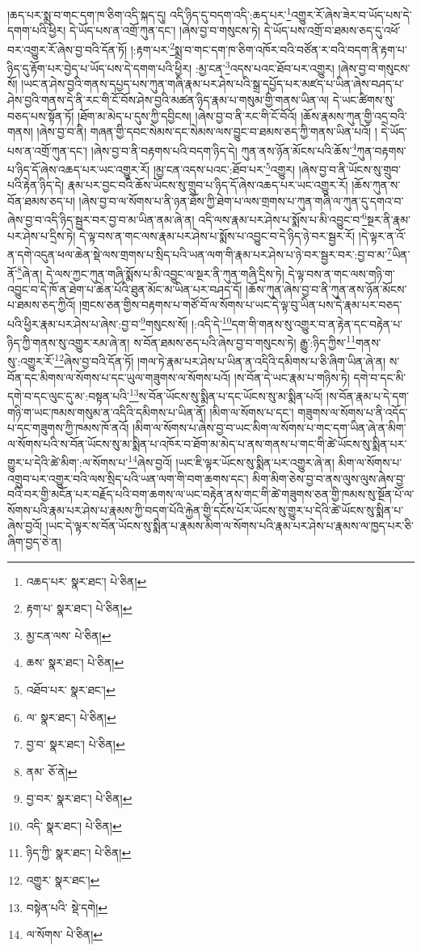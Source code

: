།ཆད་པར་སྨྲ་བ་གང་དག་ཁ་ཅིག་འདི་སྐད་དུ། འདི་ཉིད་དུ་བདག་འདི་:ཆད་པར་\footnote{འཆད་པར་  སྣར་ཐང་།  པེ་ཅིན། }འགྱུར་རོ་ཞེས་ཟེར་བ་ཡོད་པས་དེ་དགག་པའི་ཕྱིར། དེ་ཡོད་པས་ན་འགྲོ་ཀུན་དང་། །ཞེས་བྱ་བ་གསུངས་ཏེ། དེ་ཡོད་པས་འགྲོ་བ་ཐམས་ཅད་དུ་འཕོ་བར་འགྱུར་རོ་ཞེས་བྱ་བའི་དོན་ཏོ། །:རྟག་པར་\footnote{རྟག་པ་  སྣར་ཐང་།  པེ་ཅིན། }སྨྲ་བ་གང་དག་ཁ་ཅིག་འཁོར་བའི་བཙོན་ར་བའི་བདག་ནི་རྟག་པ་ཉིད་དུ་རྟོག་པར་བྱེད་པ་ཡོད་པས་དེ་དགག་པའི་ཕྱིར། :མྱ་ངན་\footnote{མྱ་ངན་ལས་  པེ་ཅིན། }འདས་པའང་ཐོབ་པར་འགྱུར། །ཞེས་བྱ་བ་གསུངས་སོ། །ཡང་ན་ཤེས་བྱའི་གནས་དཔྱད་པས་ཀུན་གཞི་རྣམ་པར་ཤེས་པའི་སྒྲ་དཔྱོད་པར་མཛད་པ་ཡིན་ཞེས་བཤད་པ་ཤེས་བྱའི་གནས་དེ་ནི་རང་གི་ངོ་བོས་ཤེས་བྱའི་མཚན་ཉིད་རྣམ་པ་གསུམ་གྱི་གནས་ཡིན་ལ། དེ་ཡང་ཚིགས་སུ་བཅད་པས་སྟོན་ཏོ། །ཐོག་མ་མེད་པ་དུས་ཀྱི་དབྱིངས། །ཞེས་བྱ་བ་ནི་རང་གི་ངོ་བོའོ། །ཆོས་རྣམས་ཀུན་གྱི་འདྲ་བའི་གནས། །ཞེས་བྱ་བ་ནི། གཞན་གྱི་དབང་སེམས་དང་སེམས་ལས་བྱུང་བ་ཐམས་ཅད་ཀྱི་གནས་ཡིན་པའོ། །
དེ་ཡོད་པས་ན་འགྲོ་ཀུན་དང་། །ཞེས་བྱ་བ་ནི་བརྟགས་པའི་བདག་ཉིད་དེ། ཀུན་ནས་ཉོན་མོངས་པའི་ཆོས་\footnote{ཆས་  སྣར་ཐང་།  པེ་ཅིན། }ཀུན་བརྟགས་པ་ཉིད་དོ་ཞེས་འཆད་པར་ཡང་འགྱུར་རོ། །མྱ་ངན་འདས་པའང་:ཐོབ་པར་\footnote{འཐོབ་པར་  སྣར་ཐང་། }འགྱུར། །ཞེས་བྱ་བ་ནི་ཡོངས་སུ་གྲུབ་པའི་རྟེན་ཉིད་དེ། རྣམ་པར་བྱང་བའི་ཆོས་ཡོངས་སུ་གྲུབ་པ་ཉིད་དོ་ཞེས་འཆད་པར་ཡང་འགྱུར་རོ། །ཆོས་ཀུན་ས་བོན་ཐམས་ཅད་པ། །ཞེས་བྱ་བ་ལ་སོགས་པ་ནི་ཉན་ཐོས་ཀྱི་ཐེག་པ་ལས་གྲགས་པ་ཀུན་གཞི་ལ་ཀུན་དུ་དགའ་བ་ཞེས་བྱ་བ་འདི་ཉིད་སྦྱར་བར་བྱ་བ་མ་ཡིན་ནམ་ཞེ་ན། འདི་ལས་རྣམ་པར་ཤེས་པ་སྨོས་པ་མི་འབྱུང་བ་\footnote{ལ་  སྣར་ཐང་།  པེ་ཅིན། }སྔར་ནི་རྣམ་པར་ཤེས་པ་དྲིས་ཏེ། དེ་ལྟ་བས་ན་གང་ལས་རྣམ་པར་ཤེས་པ་སྨོས་པ་འབྱུང་བ་དེ་ཉིད་ཉེ་བར་སྦྱར་རོ། །དེ་ལྟར་ན་འོ་ན་དགེ་འདུན་ཕལ་ཆེན་སྡེ་ལས་གྲགས་པ་སྲིད་པའི་ཡན་ལག་གི་རྣམ་པར་ཤེས་པ་ཉེ་བར་སྦྱར་བར་:བྱ་བ་མ་\footnote{བྱ་བ་  སྣར་ཐང་།  པེ་ཅིན། }ཡིན་ནོ་\footnote{ནམ་  ཅོ་ནེ། }ཞེ་ན། དེ་ལས་ཀྱང་ཀུན་གཞི་སྨོས་པ་མི་འབྱུང་ལ་སྔར་ནི་ཀུན་གཞི་དྲིས་ཏེ། དེ་ལྟ་བས་ན་གང་ལས་གཉི་ག་འབྱུང་བ་དེ་ཁོ་ན་ཐེག་པ་ཆེན་པོའི་ཐུན་མོང་མ་ཡིན་པར་བཤད་དོ། །ཆོས་ཀུན་ཞེས་བྱ་བ་ནི་ཀུན་ནས་ཉོན་མོངས་པ་ཐམས་ཅད་ཀྱིའོ། །གྲངས་ཅན་གྱིས་བརྟགས་པ་གཙོ་བོ་ལ་སོགས་པ་ཡང་དེ་ལྟ་བུ་ཡིན་པས་དེ་རྣམ་པར་བཅད་པའི་ཕྱིར་རྣམ་པར་ཤེས་པ་ཞེས་:བྱ་བ་\footnote{བྱ་བར་  སྣར་ཐང་།  པེ་ཅིན། }གསུངས་སོ། །:འདི་དེ་\footnote{འདི་  སྣར་ཐང་།  པེ་ཅིན། }དག་གི་གནས་སུ་འགྱུར་བ་ན་རྟེན་དང་བརྟེན་པ་ཉིད་ཀྱི་གནས་སུ་འགྱུར་རམ་ཞེ་ན། ས་བོན་ཐམས་ཅད་པའི་ཞེས་བྱ་བ་གསུངས་ཏེ། རྒྱུ་:ཉིད་ཀྱིས་\footnote{ཉིད་ཀྱི་  སྣར་ཐང་།  པེ་ཅིན། }གནས་སུ་:འགྱུར་རོ་\footnote{འགྱུར་  སྣར་ཐང་། }ཞེས་བྱ་བའི་དོན་ཏོ། །གལ་ཏེ་རྣམ་པར་ཤེས་པ་ཡིན་ན་འདིའི་དམིགས་པ་ཅི་ཞིག་ཡིན་ཞེ་ན། ས་བོན་དང་མིགས་ལ་སོགས་པ་དང་ཡུལ་གཟུགས་ལ་སོགས་པའོ། །ས་བོན་དེ་ཡང་རྣམ་པ་གཉིས་ཏེ། དགེ་བ་དང་མི་དགེ་བ་དང་ལུང་དུ་མ་:བསྟན་པའི་\footnote{བསྟེན་པའི་  སྡེ་དགེ། }ས་བོན་ཡོངས་སུ་སྨིན་པ་དང་ཡོངས་སུ་མ་སྨིན་པའོ། །ས་བོན་རྣམ་པ་དེ་དག་གཉི་ག་ཡང་ཁམས་གསུམ་ན་འདིའི་དམིགས་པ་ཡིན་ནོ། །མིག་ལ་སོགས་པ་དང་། གཟུགས་ལ་སོགས་པ་ནི་འདོད་པ་དང་གཟུགས་ཀྱི་ཁམས་ཁོ་ནའོ། །མིག་ལ་སོགས་པ་ཞེས་བྱ་བ་ཡང་མིག་ལ་སོགས་པ་གང་དག་ཡིན་ཞེ་ན་མིག་ལ་སོགས་པའི་ས་བོན་ཡོངས་སུ་མ་སྨིན་པ་འཁོར་བ་ཐོག་མ་མེད་པ་ནས་གནས་པ་གང་གི་ཚེ་ཡོངས་སུ་སྨིན་པར་གྱུར་པ་དེའི་ཚེ་མིག་:ལ་སོགས་པ་\footnote{ལ་སོགས་  པེ་ཅིན། }ཞེས་བྱའོ། །ཡང་ཇི་ལྟར་ཡོངས་སུ་སྨིན་པར་འགྱུར་ཞེ་ན། མིག་ལ་སོགས་པ་འགྲུབ་པར་འགྱུར་བའི་ལས་སྲིད་པའི་ཡན་ལག་གི་བག་ཆགས་དང་། མིག་མིག་ཅེས་བྱ་བ་ནས་ལུས་ལུས་ཞེས་བྱ་བའི་བར་གྱི་མངོན་པར་བརྗོད་པའི་བག་ཆགས་ལ་ཡང་བརྟེན་ནས་གང་གི་ཚེ་གཟུགས་ཅན་གྱི་ཁམས་སུ་སྔོན་པོ་ལ་སོགས་པའི་རྣམ་པར་ཤེས་པ་རྣམས་ཀྱི་བདག་པོའི་རྐྱེན་གྱི་དངོས་པོར་ཡོངས་སུ་གྱུར་པ་དེའི་ཚེ་ཡོངས་སུ་སྨིན་པ་ཞེས་བྱའོ། །ཡང་དེ་ལྟར་ས་བོན་ཡོངས་སུ་སྨིན་པ་རྣམས་མིག་ལ་སོགས་པའི་རྣམ་པར་ཤེས་པ་རྣམས་ལ་ཁྱད་པར་ཅི་ཞིག་བྱད་ཅེ་ན། 